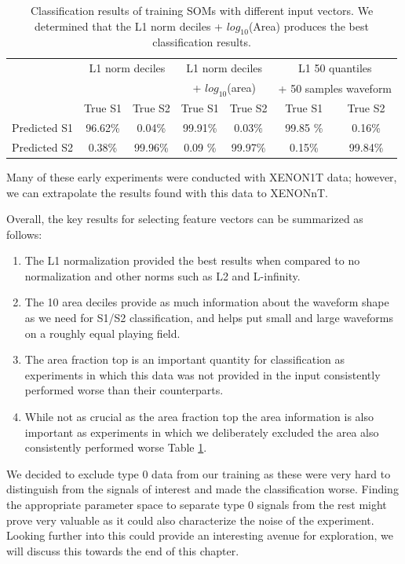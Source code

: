 \begin{table}[t]
\begin{tabular}{c|c|c|c|c|c|c}
    & \multicolumn{2}{c}{L1 norm deciles} & \multicolumn{2}{|c|}{L1 norm deciles} & \multicolumn{2}{c}{L1 50 quantiles}  \\
    & \multicolumn{2}{c}{} & \multicolumn{2}{|c|}{+ $log_{10}$(area)} &  \multicolumn{2}{c}{+ 50 samples  waveform} \\
    \hline
    & True S1 &  True S2 & True S1 &  True S2 & True S1 &  True S2 \\
    \hline
    Predicted S1 & 96.62\% & 0.04\% & 99.91\% & 0.03\% & 99.85 \% & 0.16\% \\
    \hline
    Predicted S2 &  0.38\% & 99.96\% & 0.09 \% & 99.97\% & 0.15\% & 99.84\% \\
\end{tabular}
    \caption{Classification results of training SOMs with different input vectors. We determined that the L1 norm deciles + $log_{10}$(Area) produces the best classification results.}
    \label{som_diff_inputs_results}
\end{table}

Many of these early experiments were conducted with XENON1T data; however, we can extrapolate the results found with this data to XENONnT. 

Overall, the key results for selecting feature vectors can be summarized as follows:

\begin{enumerate}
    \item The L1 normalization provided the best results when compared to no normalization and other norms such as L2 and L-infinity.
    \item The 10 area deciles provide as much information about the waveform shape as we need for S1/S2 classification, and helps put small and large waveforms on a roughly equal playing field.
    \item The area fraction top is an important quantity for classification as experiments in which this data was not provided in the input consistently performed worse than their counterparts.
    \item While not as crucial as the area fraction top the area information is also important as experiments in which we deliberately excluded the area also consistently performed worse Table \ref{som_diff_inputs_results}.
\end{enumerate}

We decided to exclude type 0 data from our training as these were very hard to distinguish from the signals of interest and made the classification worse. Finding the appropriate parameter space to separate type 0 signals from the rest might prove very valuable as it could also characterize the noise of the experiment. Looking further into this could provide an interesting avenue for exploration, we will discuss this towards the end of this chapter.


